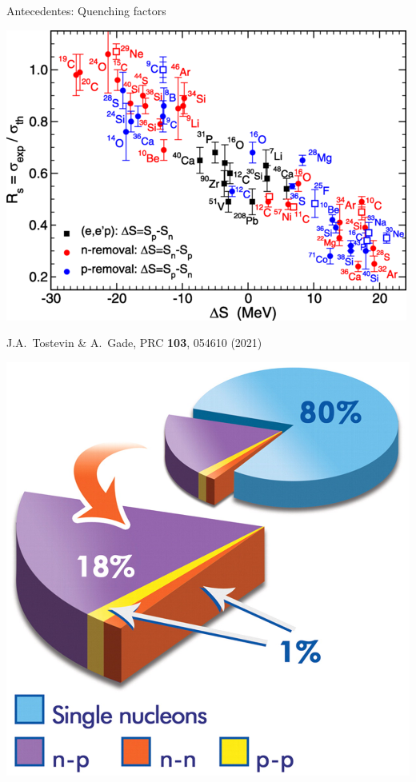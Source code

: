 \documentclass{beamer}
\begin{document}
\begin{frame}{Antecedentes: Quenching factors} 
    \begin{minipage}{0.45\textwidth}
    \begin{center}
    \includegraphics[height=0.4\textheight]{Tostevin.png}
    
    \tiny J.A.~Tostevin \& A.~Gade, PRC \textbf{103}, 054610 (2021)
    \end{center}
    \end{minipage}
    \begin{minipage}{0.45\textwidth}
    \begin{center}
    \includegraphics[height=0.4\textheight]{subedi.jpeg}
    

\end{center}
\end{minipage}
\end{frame}
\end{document}
